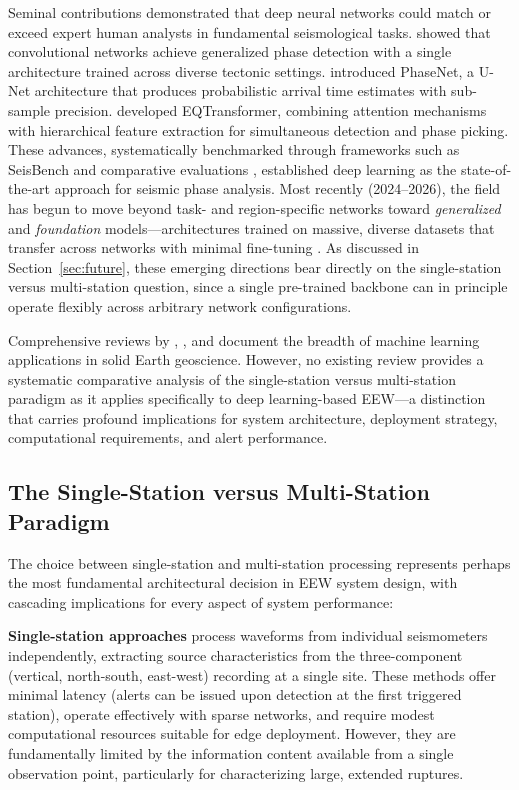 \documentclass[review,authoryear]{elsarticle}
\begin{document}
Seminal contributions demonstrated that deep neural networks could match or exceed expert human analysts in fundamental seismological tasks. \citet{ross2018generalized} showed that convolutional networks achieve generalized phase detection with a single architecture trained across diverse tectonic settings. \citet{zhu2019phasenet} introduced PhaseNet, a U-Net architecture that produces probabilistic arrival time estimates with sub-sample precision. \citet{mousavi2020earthquake} developed EQTransformer, combining attention mechanisms with hierarchical feature extraction for simultaneous detection and phase picking. These advances, systematically benchmarked through frameworks such as SeisBench \citep{woollam2022seisbench} and comparative evaluations \citep{munchmeyer2022picker}, established deep learning as the state-of-the-art approach for seismic phase analysis. Most recently (2024--2026), the field has begun to move beyond task- and region-specific networks toward \emph{generalized} and \emph{foundation} models---architectures trained on massive, diverse datasets that transfer across networks with minimal fine-tuning \citep{zhang2024universal, liu2024seislm, saad2026utrans}. As discussed in Section~\ref{sec:future}, these emerging directions bear directly on the single-station versus multi-station question, since a single pre-trained backbone can in principle operate flexibly across arbitrary network configurations.

Comprehensive reviews by \citet{bergen2019machine}, \citet{kong2019machine}, and \citet{mousavi2022deep} document the breadth of machine learning applications in solid Earth geoscience. However, no existing review provides a systematic comparative analysis of the single-station versus multi-station paradigm as it applies specifically to deep learning-based EEW---a distinction that carries profound implications for system architecture, deployment strategy, computational requirements, and alert performance.

\subsection{The Single-Station versus Multi-Station Paradigm}

The choice between single-station and multi-station processing represents perhaps the most fundamental architectural decision in EEW system design, with cascading implications for every aspect of system performance:

\textbf{Single-station approaches} process waveforms from individual seismometers independently, extracting source characteristics from the three-component (vertical, north-south, east-west) recording at a single site. These methods offer minimal latency (alerts can be issued upon detection at the first triggered station), operate effectively with sparse networks, and require modest computational resources suitable for edge deployment. However, they are fundamentally limited by the information content available from a single observation point, particularly for characterizing large, extended ruptures.
\end{document}
